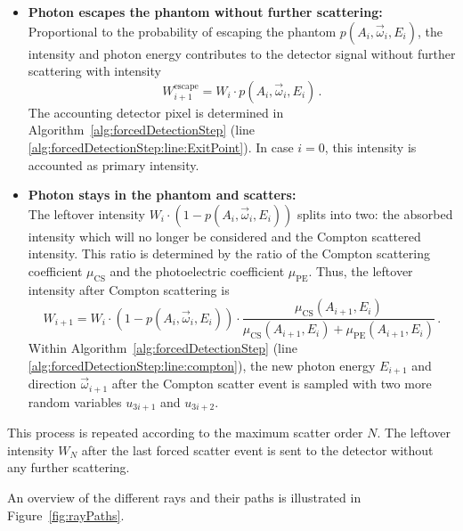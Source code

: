 \begin{itemize}
    \item \textbf{Photon escapes the phantom without further scattering:}\\
        Proportional to the probability of escaping the phantom
        $p(A_i,\vec{\omega}_i,E_i)$, the intensity and photon energy contributes
        to the detector signal without further scattering with intensity
        \begin{equation*}
            W^{\text{escape}}_{i+1} = W_i \cdot p(A_i, \vec{\omega}_i, E_i)\,.
        \end{equation*}
        The accounting detector pixel is determined in
        Algorithm~\ref{alg:forcedDetectionStep} (line
        \ref{alg:forcedDetectionStep:line:ExitPoint}).
        In case $i=0$, this intensity is accounted as primary intensity.
    \item \textbf{Photon stays in the phantom and scatters:}\\
        The leftover intensity $W_i \cdot (1 - p(A_i, \vec{\omega}_i, E_i))$
        splits into two: the absorbed intensity which will no longer be considered and the Compton scattered
        intensity. This ratio is determined by the ratio of the Compton
        scattering coefficient $\mu_{\text{CS}}$ and the photoelectric
        coefficient $\mu_{\text{PE}}$. Thus, the leftover intensity after
        Compton scattering is
        \begin{equation*}
            W_{i+1} = W_i \cdot (1 - p(A_i, \vec{\omega}_i, E_i)) \cdot \frac{\mu_{\text{CS}}(A_{i+1}, E_i)}{\mu_{\text{CS}}(A_{i+1}, E_i) + \mu_{\text{PE}}(A_{i+1}, E_i)}\,.
        \end{equation*}
        Within Algorithm~\ref{alg:forcedDetectionStep} (line \ref{alg:forcedDetectionStep:line:compton}), the new
        photon energy $E_{i+1}$ and direction $\vec{\omega}_{i+1}$ after the
        Compton scatter event is sampled with two more random variables
        $u_{3i+1}$ and $u_{3i+2}$.
\end{itemize}

This process is repeated according to the maximum scatter order $N$. The
leftover intensity $W_N$ after the last forced scatter event is sent to the
detector without any further scattering.

An overview of the different rays and their paths is illustrated in Figure~\ref{fig:rayPaths}.

